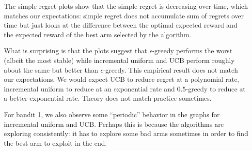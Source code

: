 \documentclass[paper=a4, fontsize=11pt]{scrartcl}
\begin{document}
The simple regret plots show that the simple regret is decreasing over time, which matches our expectations: simple regret does not accumulate sum of regrets over time but just looks at the difference between the optimal expected reward and the expected reward of the best arm selected by the algorithm.

What is surprising is that the plots suggest that $\epsilon$-greedy performs the worst (albeit the most stable) while incremental uniform and UCB perform roughly about the same but better than $\epsilon$-greedy. This empirical result does not match our expectations. We would expect UCB to reduce regret at a polynomial rate, incremental uniform to reduce at an exponential rate and $0.5$-greedy to reduce at a better exponential rate. Theory does not match practice sometimes.

For bandit 1, we also observe some ``periodic'' behavior in the graphs for incremental uniform and UCB. Perhaps this is because the algorithms are exploring consistently: it has to explore some bad arms sometimes in order to find the best arm to exploit in the end.
\end{document}
